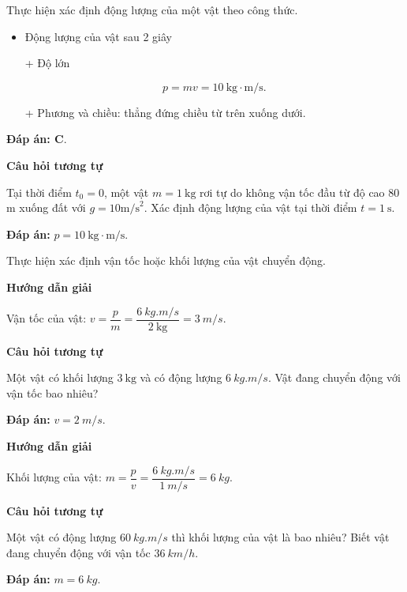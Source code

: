 \begin{dang}{Thực hiện xác định động lượng của một vật theo công thức.}
{\begin{itemize}
			+ Phương và chiều: thẳng đứng chiều từ trên xuống dưới.
			
			\item Động lượng của vật sau 2 giây
			
			+ Độ lớn 
			
			\begin{equation*}
				p=mv= 10\ \text{kg} \cdot \text{m/s}.
			\end{equation*}
			
			+ Phương và chiều: thẳng đứng chiều từ trên xuống dưới.
		\end{itemize}
		
		\textbf{Đáp án: C}.
		
		\begin{center}
			\textbf{Câu hỏi tương tự}
		\end{center}
	
	Tại thời điểm $t_0=0$, một vật $m = 1\ \text{kg}$ rơi tự do không vận tốc đầu từ độ cao 80 m xuống đất với $g=10 \text{m/s}^2$. Xác định động lượng của vật tại thời điểm $t = 1\ \text{s}$.
	
	\textbf{Đáp án:} $p=10\ \text{kg} \cdot \text{m/s}$.
	}
\end{dang}

\begin{dang}{Thực hiện xác định vận tốc hoặc khối lượng của vật chuyển động.}
	{	\begin{center}
			\textbf{Hướng dẫn giải}
		\end{center}
		
		Vận tốc của vật: $v=\dfrac{p}{m}=\dfrac{\SI{6}{kg.m/s}}{\SI{2}{\kilogram}}=\SI{3}{m/s}$.
		
		\begin{center}
			\textbf{Câu hỏi tương tự}
		\end{center}
	
	Một vật có khối lượng $\SI{3}{\kilogram}$ và có động lượng $\SI{6}{kg.m/s}$. Vật đang chuyển động với vận tốc bao nhiêu?
	
	\textbf{Đáp án:} $v=\SI{2}{m/s}$.
	}
	{	\begin{center}
			\textbf{Hướng dẫn giải}
		\end{center}
		
		Khối lượng của vật: $m=\dfrac{p}{v}=\dfrac{\SI{6}{kg.m/s}}{\SI{1}{m/s}}=\SI{6}{kg}$.
		
		\begin{center}
			\textbf{Câu hỏi tương tự}
		\end{center}
		
		Một vật có động lượng $\SI{60}{kg.m/s}$ thì khối lượng của vật là bao nhiêu? Biết vật đang chuyển động với vận tốc $\SI{36}{km/h}$.
		
		\textbf{Đáp án:} $m=\SI{6}{kg}$.
	}
\end{dang}